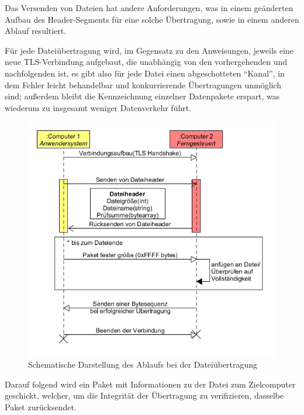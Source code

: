 Das Versenden von Dateien hat andere Anforderungen, was in einem geänderten Aufbau des Header-Segments für eine solche Übertragung, sowie in einem anderen Ablauf resultiert.\par
Für jede Dateiübertragung wird, im Gegensatz zu den Anweisungen, jeweils eine neue TLS-Verbindung aufgebaut, die unabhängig von den vorhergehenden und nachfolgenden ist, es gibt also für jede Datei einen abgeschotteten "`Kanal"', in dem Fehler leicht behandelbar und konkurrierende Übertragungen unmöglich sind; außerdem bleibt die Kennzeichnung einzelner Datenpakete erspart, was wiederum zu insgesamt weniger Datenverkehr führt.

\begin{figure}
\includegraphics[scale=.4]{diagramFileProtocol}
\caption{Schematische Darstellung des Ablaufs bei der Dateiübertragung}
\label{file_diagram}
\end{figure}

Darauf folgend wird ein Paket mit Informationen zu der Datei zum Zielcomputer geschickt, welcher, um die Integrität der Übertragung zu verifizieren, dasselbe Paket zurücksendet.\\

